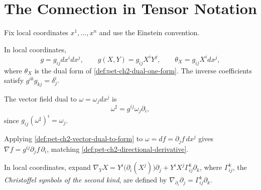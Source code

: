 \section{The Connection in Tensor Notation}

Fix local coordinates $x^1,\dots,x^n$ and use the Einstein convention.

\begin{definition}
  \label{def:pet-ch2-metric-coordinate-formulas}


  In local coordinates,
  \[
    g=g_{ij}dx^i dx^j,\qquad
    g(X,Y)=g_{ij}X^iY^j,\qquad
    \theta_X=g_{ij}X^i dx^j,
  \]
  where $\theta_X$ is the dual form of \cref{def:pet-ch2-dual-one-form}.
  The inverse coefficients satisfy $g^{ik}g_{kj}=\delta^i_j$.
\end{definition}

\begin{definition}
  \label{def:pet-ch2-vector-dual-to-form}


  The vector field dual to
  $\omega=\omega_jdx^j$ is
  \[
    \omega^\sharp=g^{ij}\omega_j\partial_i,
  \]
  since $g_{ij}(\omega^\sharp)^i=\omega_j$.
\end{definition}

\begin{remark}
  \label{rem:pet-ch2-gradient-coordinate-formula}


  Applying \cref{def:pet-ch2-vector-dual-to-form} to $\omega=df=\partial_jf\,dx^j$
  gives $\nabla f=g^{ij}\partial_jf\,\partial_i$, matching
  \cref{def:pet-ch2-directional-derivative}.
\end{remark}

\begin{definition}
  \label{def:pet-ch2-christoffel-symbols-second-kind}


  In local coordinates, expand
  $\nabla_YX=Y^i\big(\partial_i(X^j)\big)\partial_j+Y^iX^j\Gamma^k_{ij}\partial_k$, where
  $\Gamma^k_{ij}$, the \emph{Christoffel symbols of the second kind}, are
  defined by $\nabla_{\partial_i}\partial_j=\Gamma^k_{ij}\partial_k$.
\end{definition}

